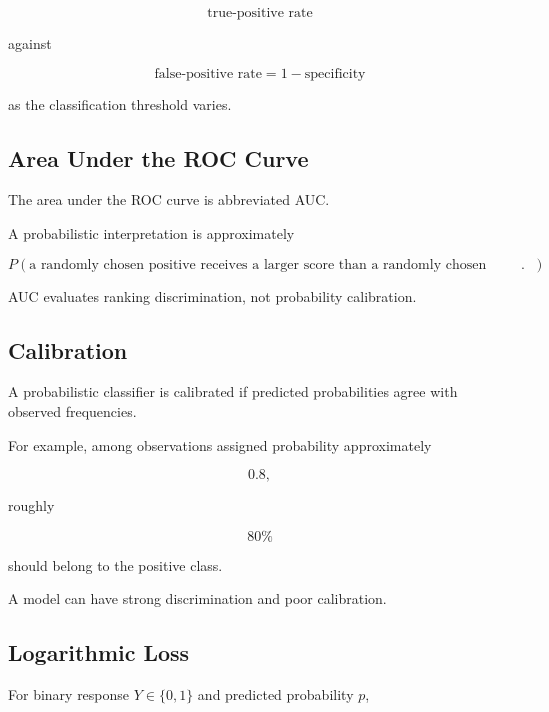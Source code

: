 \[
\boxed{
\text{true-positive rate}
}
\]

against

\[
\boxed{
\text{false-positive rate}
=
1-\text{specificity}
}
\]

as the classification threshold varies.

\subsection{Area Under the ROC Curve}
\label{subsec:auc}

The area under the ROC curve is abbreviated AUC.

A probabilistic interpretation is approximately

\[
\boxed{
P
(
\text{a randomly chosen positive receives a larger score than a
randomly chosen negative}
).
}
\]

AUC evaluates ranking discrimination, not probability calibration.

\subsection{Calibration}
\label{subsec:classification-calibration}

A probabilistic classifier is calibrated if predicted probabilities agree
with observed frequencies.

For example, among observations assigned probability approximately

\[
0.8,
\]

roughly

\[
80\%
\]

should belong to the positive class.

A model can have strong discrimination and poor calibration.

\subsection{Logarithmic Loss}
\label{subsec:log-loss}

For binary response \(Y\in\{0,1\}\) and predicted probability \(p\),

